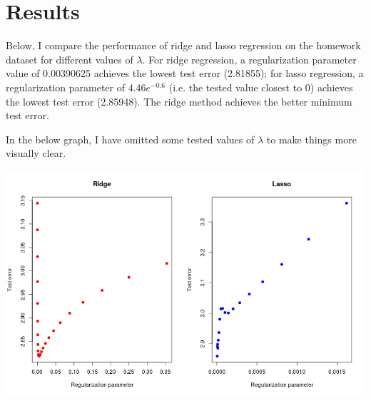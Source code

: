 \documentclass{article}
\begin{document}
\section*{Results}

Below, I compare the performance of ridge and lasso regression on the homework
dataset for different values of $\lambda$. For ridge regression, a
regularization parameter value of 0.00390625 achieves the lowest test error
(2.81855); for lasso regression, a regularization parameter of $4.46e^{-0.6}$
(i.e. the tested value closest to 0) achieves the lowest test error (2.85948).
The ridge method achieves the better minimum test error. 

In the below graph, I have omitted some tested values of $\lambda$ to make
things more visually clear.

\includegraphics[scale=0.5]{foo}
\end{document}
